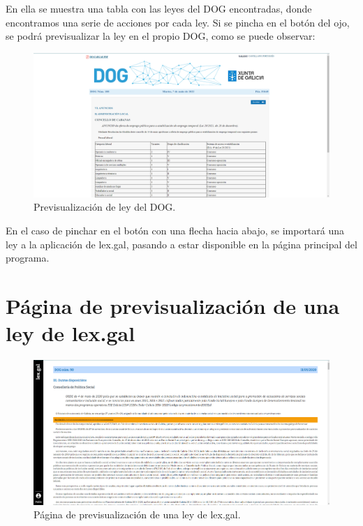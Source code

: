 En ella se muestra una tabla con las leyes del DOG encontradas, donde encontramos una serie de acciones por cada ley. Si se pincha en el botón del ojo, se podrá previsualizar la ley en el propio DOG, como se puede observar:

\begin{figure}[H]
\centerline{\includegraphics[width=15cm]{figuras/manualUsuario/PrevisualizarDOG.PNG}}
\caption{Previsualización de ley del DOG.}
\label{enlacePrevisDOG}
\end{figure}

En el caso de pinchar en el botón con una flecha hacia abajo, se importará una ley a la aplicación de lex.gal, pasando a estar disponible en la página principal del programa.

\section{Página de previsualización de una ley de lex.gal}
\label{PPrevisualizacionLexGal}

\begin{figure}[H]
\centerline{\includegraphics[width=15cm]{figuras/manualUsuario/PrevisualizarLEXGAL.PNG}}
\caption{Página de previsualización de una ley de lex.gal.}
\label{enlacePrevisualizacionLexGal}
\end{figure}

